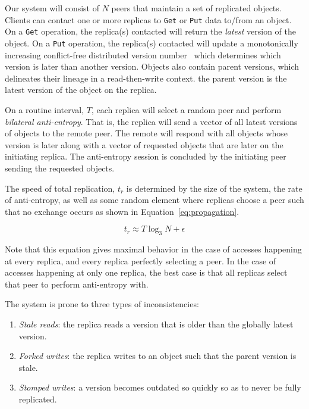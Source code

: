 \documentclass[letterpaper,11pt,onecolumn]{article}
\begin{document}
Our system will consist of $N$ peers that maintain a set of replicated
objects.
Clients can contact one or more replicas to \texttt{Get} or \texttt{Put} data
to/from an object.
On a \texttt{Get} operation, the replica(s) contacted will return the
\emph{latest} version of the object.
On a \texttt{Put} operation, the replica(s) contacted will update a
monotonically increasing conflict-free distributed version
number~\cite{almeida2002version,parker1983detection} which determines which
version is later than another version.
Objects also contain parent versions, which delineates their lineage in a
read-then-write context.
the parent version is the latest version of the object on the replica.

On a routine interval, $T$, each replica will select a random peer and
perform \emph{bilateral anti-entropy}.
That is, the replica will send a vector of all latest versions of objects to
the remote peer.
The remote will respond with all objects whose version is later along with
a vector of requested objects that are later on the initiating replica.
The anti-entropy session is concluded by the initiating peer sending the
requested objects.

The speed of total replication, $t_r$ is determined by the size of the system,
the rate of anti-entropy, as well as some random element where replicas
choose a peer such that no exchange occurs as shown in
Equation~\ref{eq:propagation}.

\begin{equation}
t_{r} \approx T \log_3N + \epsilon
\label{eq:propagation}
\end{equation}

Note that this equation gives maximal behavior in the case of accesses
happening at every replica, and every replica perfectly selecting a peer.
In the case of accesses happening at only one replica, the best case is that
all replicas select that peer to perform anti-entropy with.

The system is prone to three types of inconsistencies:

\begin{enumerate}
    \item \emph{Stale reads}: the replica reads a version that is older than the globally latest version.
    \item \emph{Forked writes}: the replica writes to an object such that the
    parent version is stale.
    \item \emph{Stomped writes}: a version becomes outdated so quickly so as
    to never be fully replicated.
\end{enumerate}
\end{document}
